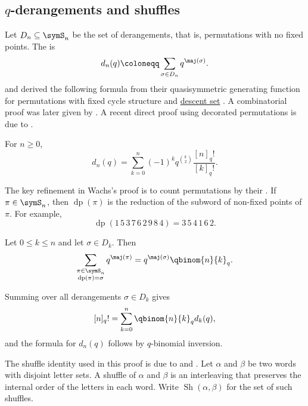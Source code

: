 \subsection[qDerangementsAndShuffles]{$q$-derangements and shuffles}

Let $D_n \subseteq \symS_n$ be the set of derangements, that is,
permutations with no fixed points.  The 
\label{qDerangementNumber} is
\[
  d_n(q) \coloneqq \sum_{\sigma \in D_n} q^{\maj(\sigma)}.
\]
 and  derived the following
formula from their quasisymmetric generating function for permutations with
fixed cycle structure and \hyperref[descentSet]{descent set}
\cite{GesselReutenauer1993}.  A
combinatorial proof was later given by 
\cite{Wachs1989QDerangement}.  A recent direct proof using decorated
permutations is due to  \cite{Ji2026x}.

\begin{theorem}
For $n \geq 0$,
\[
  d_n(q) =
  \sum_{k=0}^n (-1)^k q^{\binom{k}{2}}\frac{[n]_q!}{[k]_q!}.
\]
\end{theorem}

The key refinement in Wachs's proof is to count permutations by their
\label{derangementPart}.  If
\(\pi \in \symS_n\), then \(\operatorname{dp}(\pi)\) is the reduction of
the subword of non-fixed points of \(\pi\).  For example,
\[
  \operatorname{dp}(1\,5\,3\,7\,6\,2\,9\,8\,4)=3\,5\,4\,1\,6\,2.
\]

\begin{proposition}
Let \(0 \leq k \leq n\) and let \(\sigma \in D_k\).  Then
\[
  \sum_{\substack{\pi \in \symS_n\\ \operatorname{dp}(\pi)=\sigma}}
  q^{\maj(\pi)}
  =
  q^{\maj(\sigma)}\qbinom{n}{k}_q.
\]
\end{proposition}

Summing over all derangements \(\sigma \in D_k\) gives
\[
  [n]_q! = \sum_{k=0}^n \qbinom{n}{k}_q d_k(q),
\]
and the formula for \(d_n(q)\) follows by \(q\)-binomial inversion.

The shuffle identity used in this proof is due to
 and 
\cite[Thm.~3.1]{GarsiaGessel1979}.  Let \(\alpha\) and \(\beta\) be two
words with disjoint letter sets.  A shuffle of \(\alpha\) and \(\beta\) is
an interleaving that preserves the internal order of the letters in each
word.  Write \(\operatorname{Sh}(\alpha,\beta)\) for the set of such
shuffles.

